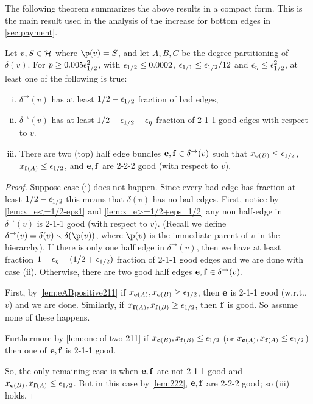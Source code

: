 The following theorem summarizes the above results in a compact form. This is the main result used in the analysis of the increase for bottom edges in \cref{sec:payment}.
\begin{theorem}
	\label{thm:probabilistic}
	Let $v, S \in \mathcal{H}$ where $\p(v) =S$, and let $A,B,C$ be the \hyperlink{tar:degreepartition}{degree partitioning} of $\delta(v)$. For $p\geq 0.005{\epsilon}_{1/2}^2$, with ${\epsilon}_{1/2}\leq 0.0002$, ${\epsilon}_{1/1}\leq {\epsilon}_{1/2}/12$ and ${\epsilon}_{\eta}\leq {\epsilon}_{1/2}^2$, at least one of the following is true:
	\begin{enumerate}[i)]
		\item $\delta^\rightarrow(v)$ has at least $1/2-{\epsilon}_{1/2}$ fraction of bad edges,
		\item $\delta^\rightarrow(v)$ has at least $1/2-{\epsilon}_{1/2}-{\epsilon}_\eta$ fraction of 2-1-1 good edges with respect to $v$.
		\item There are two (top) half edge bundles ${\bf e},{\bf f}\in\delta^\rightarrow(v)$ such that $x_{{\bf e}(B)}\leq {\epsilon}_{1/2}$, $x_{{\bf f}(A)}\leq {\epsilon}_{1/2}$, and ${\bf e}, {\bf f}$
 are 2-2-2 good (with respect to $v$).
	\end{enumerate}
\end{theorem}
\begin{proof}
	Suppose case (i) does not happen. Since every bad edge has fraction at least $1/2-{\epsilon}_{1/2}$ this means that $\delta(v)$ has no bad edges.
First, notice by \cref{lem:x_e<=1/2-eps1} and \cref{lem:x_e>=1/2+eps_1/2} any non half-edge in $\delta^\rightarrow(v)$ is 2-1-1 good (with respect to $v$). (Recall we define $\delta^\rightarrow(v) = \delta(v) \smallsetminus \delta(\p(v))$, where $\p(v)$ is the immediate parent of $v$ in the hierarchy).
	If there is only one half edge in $\delta^\rightarrow(v)$, then we have at least fraction $1-{\epsilon}_{\eta} - (1/2+{\epsilon}_{1/2})$ fraction of 2-1-1 good edges and we are done with case (ii).
	Otherwise,  there are two good half edges ${\bf e},{\bf f}\in \delta^\rightarrow(v)$. 
	
	First, by \cref{lem:eABpositive211} if $x_{{\bf e}(A)},x_{{\bf e}(B)}\geq {\epsilon}_{1/2}$, then ${\bf e}$ is 2-1-1 good (w.r.t., $v$) and we are done.
	Similarly, if $x_{{\bf f}(A)},x_{{\bf f}(B)}\geq  {\epsilon}_{1/2}$, then ${\bf f}$ is good. So assume none of these happens.
	
	Furthermore by \cref{lem:one-of-two-211} if $x_{{\bf e}(B)},x_{{\bf f}(B)}\leq {\epsilon}_{1/2}$ (or $x_{{\bf e}(A)},x_{{\bf f}(A)}\leq {\epsilon}_{1/2}$) then one of ${\bf e},{\bf f}$ is 2-1-1 good.
	
	So, the only remaining case is when ${\bf e},{\bf f}$ are not 2-1-1 good and $x_{{\bf e}(B)},x_{{\bf f}(A)}\leq {\epsilon}_{1/2}$. But in this case by \cref{lem:222}, ${\bf e},{\bf f}$ are 2-2-2 good; so (iii) holds.
\end{proof}




